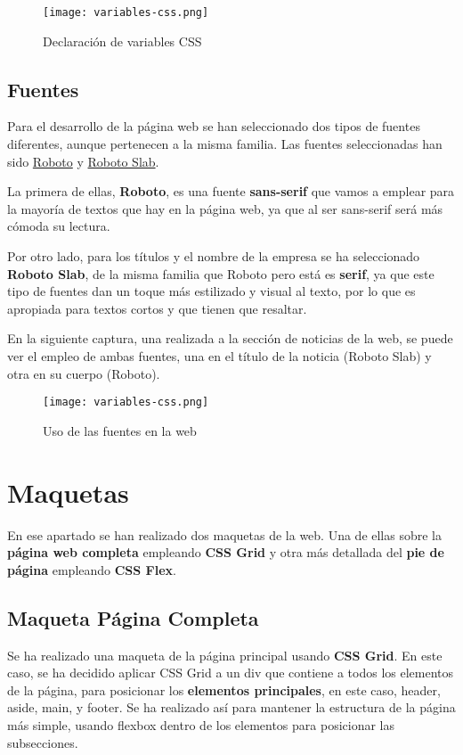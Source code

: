 \begin{figure}[H]
    \centering
    \texttt{[image: variables-css.png]}
    \caption{Declaración de variables CSS}
\end{figure}

\subsection{Fuentes}
Para el desarrollo de la página web se han seleccionado dos tipos de fuentes diferentes, aunque pertenecen a la misma familia. Las fuentes seleccionadas han sido \href{https://fonts.google.com/specimen/Roboto}{Roboto} y \href{https://fonts.google.com/specimen/Roboto+Slab?query=robot+slab}{Roboto Slab}.

La primera de ellas, \textbf{Roboto}, es una fuente \textbf{sans-serif} que vamos a emplear para la mayoría de textos que hay en la página web, ya que al ser sans-serif será más cómoda su lectura.

Por otro lado, para los títulos y el nombre de la empresa se ha seleccionado \textbf{Roboto Slab}, de la misma familia que Roboto pero está es \textbf{serif}, ya que este tipo de fuentes dan un toque más estilizado y visual al texto, por lo que es apropiada para textos cortos y que tienen que resaltar.

En la siguiente captura, una realizada a la sección de noticias de la web, se puede ver el empleo de ambas fuentes, una en el título de la noticia (Roboto Slab) y otra en su cuerpo (Roboto).

\begin{figure}[H]
    \centering
    \texttt{[image: variables-css.png]}
    \caption{Uso de las fuentes en la web}
\end{figure}

\section{Maquetas}
En ese apartado se han realizado dos maquetas de la web. Una de ellas sobre la \textbf{página web completa} empleando \textbf{CSS Grid} y otra más detallada del \textbf{pie de página} empleando \textbf{CSS Flex}.

\subsection{Maqueta Página Completa}
Se ha realizado una maqueta de la página principal usando \textbf{CSS Grid}. En este caso, se ha decidido aplicar CSS Grid a un div que contiene a todos los elementos de la página, para posicionar los \textbf{elementos principales}, en este caso, header, aside, main, y footer. Se ha realizado así para mantener la estructura de la página más simple, usando flexbox dentro de los elementos para posicionar las subsecciones.

